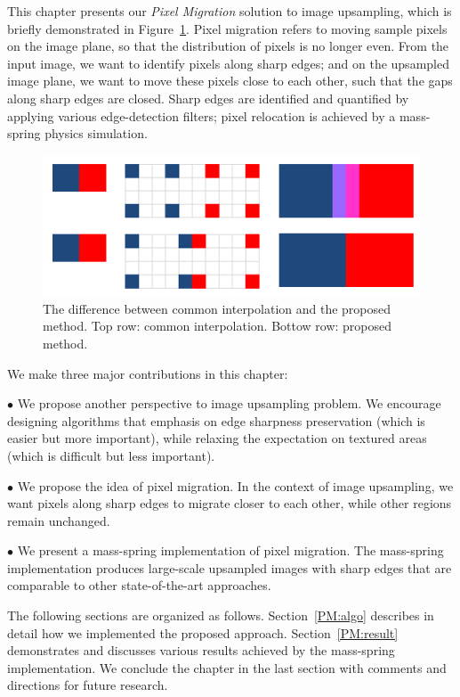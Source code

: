 This chapter presents our \textit{Pixel Migration} solution to image upsampling, which is briefly demonstrated in Figure~\ref{fig:pixelMigrationDemo}. Pixel migration refers to moving sample pixels on the image plane, so that the distribution of pixels is no longer even. From the input image, we want to identify pixels along sharp edges; and on the upsampled image plane, we want to move these pixels close to each other, such that the gaps along sharp edges are closed. Sharp edges are identified and quantified by applying various edge-detection filters; pixel relocation is achieved by a mass-spring physics simulation. 

\begin{figure}[htbp]\centering
\includegraphics{imagesPM/f3.png}
\caption{The difference between common interpolation and the proposed method. Top row: common interpolation. Bottow row: proposed method.}
\label{fig:pixelMigrationDemo}
\end{figure}

We make three major contributions in this chapter:

$\bullet$ We propose another perspective to image upsampling problem. We encourage designing algorithms that emphasis on edge sharpness preservation (which is easier but more important), while relaxing the expectation on textured areas (which is difficult but less important).

$\bullet$ We propose the idea of pixel migration. In the context of image upsampling, we want pixels along sharp edges to migrate closer to each other, while other regions remain unchanged. 

$\bullet$ We present a mass-spring implementation of pixel migration. The mass-spring implementation produces large-scale upsampled images with sharp edges that are comparable to other state-of-the-art approaches. 

The following sections are organized as follows. Section~\ref{PM:algo} describes in detail how we implemented the proposed approach. Section~\ref{PM:result} demonstrates and discusses various results achieved by the mass-spring implementation. We conclude the chapter in the last section with comments and directions for future research.

